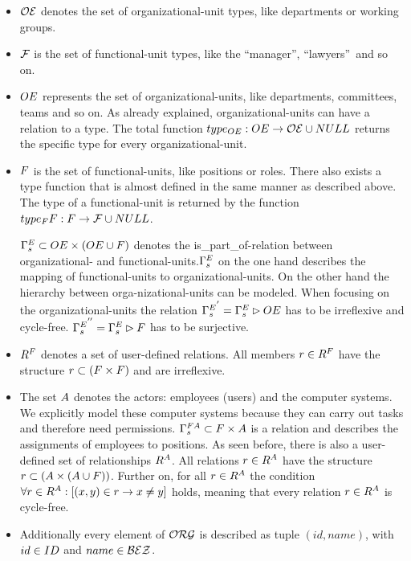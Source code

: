	\begin{itemize}

	\item $\mathcal{OE}$ denotes the set of organizational-unit types, like departments or working groups.


	\item $\mathcal{F}$ is the set of functional-unit types, like the ``manager'', ``lawyers''\ and so on.


	\item $OE$ represents the set of organizational-units, like departments, committees, teams and so on. As already explained, organizational-units can have a relation to a type. The total function $type_{OE}: OE \rightarrow \mathcal{OE} \cup NULL$ returns the specific type for every organizational-unit. 

	\item $F$ is the set of functional-units, like positions or roles. There also exists a type function that is almost defined in the same manner as described above. The type of a functional-unit is returned by the function $type_F{F}: F \rightarrow \mathcal{F} \cup NULL$. 
	
	$\relstrukturOE_F \subset \oe \times (\oe \cup \f)$ denotes the is\_part\_of-relation between organizational- and functional-units.$\relstrukturOE_F$ on the one hand	describes the mapping of functional-units to organizational-units. On the	other hand the hierarchy between orga-nizational-units can be modeled. When focusing on the organizational-units the relation ${\relstrukturOE_F}^{'} = \relstrukturOE_F \rhd \oe$ has to be irreflexive and cycle-free. ${\relstrukturOE_F}^{''} = \relstrukturOE_F \rhd \f$ has to be surjective.
	  
	\item  $R^{F}$ denotes a set of user-defined relations. All members $r \in R^{F}$ have the structure $r \subset (F \times F)$ and	are irreflexive.

	\item The set $A$ denotes the actors: employees (users) and the computer systems. We explicitly model these computer systems because they can carry out tasks and therefore need permissions. ${\Gamma}^{FA}_{s} \subset F \times A$ is a relation and describes the assignments of employees to positions. As seen before, there is also a user-defined set of relationships $R^{A}$. All relations $r \in R^{A}$ have the structure $r \subset (A \times (A \cup F))$. Further on, for all $r \in R^{A}$ the condition $\forall r \in R^{A}: \left[(x,y) \in r \rightarrow x \neq y \right]$ holds, meaning that every relation	$r \in R^{A}$ is cycle-free.

	\item Additionally every element of $\mathcal{ORG}$ is described as tuple $(id, name)$, with $id \in ID$ and $name \in \mathcal{BEZ}$.
	
	\end{itemize}

